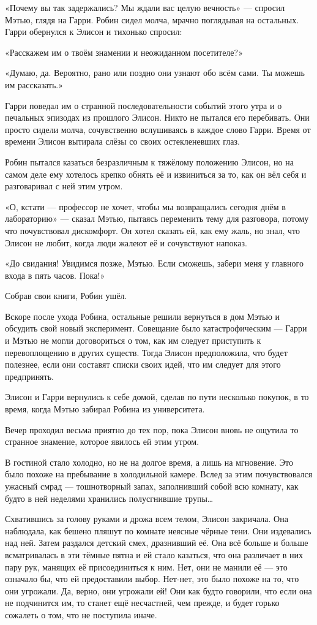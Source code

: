 \documentclass[a5paper, 9pt,
final, openany, twoside=true]{memoir}
\begin{document}
«Почему вы так задержались? Мы ждали вас целую вечность» — спросил Мэтью, глядя на Гарри. Робин сидел молча, мрачно поглядывая на остальных. Гарри обернулся к Элисон и тихонько спросил:

«Расскажем им о твоём знамении и неожиданном посетителе?»

«Думаю, да. Вероятно, рано или поздно они узнают обо всём сами. Ты можешь им рассказать.»

Гарри поведал им о странной последовательности событий этого утра и о печальных эпизодах из прошлого Элисон. Никто не пытался его перебивать. Они просто сидели молча, сочувственно вслушиваясь в каждое слово Гарри. Время от времени Элисон вытирала слёзы со своих остекленевших глаз.

Робин пытался казаться безразличным к тяжёлому положению Элисон, но на самом деле ему хотелось крепко обнять её и извиниться за то, как он вёл себя и разговаривал с ней этим утром.

«О, кстати — профессор не хочет, чтобы мы возвращались сегодня днём в лабораторию» — сказал Мэтью, пытаясь переменить тему для разговора, потому что почувствовал дискомфорт. Он хотел сказать ей, как ему жаль, но знал, что Элисон не любит, когда люди жалеют её и сочувствуют напоказ.

«До свидания! Увидимся позже, Мэтью. Если сможешь, забери меня у главного входа в пять часов. Пока!»

Собрав свои книги, Робин ушёл.\bigskip

Вскоре после ухода Робина, остальные решили вернуться в дом Мэтью и обсудить свой новый эксперимент. Совещание было катастрофическим — Гарри и Мэтью не могли договориться о том, как им следует приступить к перевоплощению в других существ. Тогда Элисон предположила, что будет полезнее, если они составят списки своих идей, что им следует для этого предпринять.

Элисон и Гарри вернулись к себе домой, сделав по пути несколько покупок, в то время, когда Мэтью забирал Робина из университета.

Вечер проходил весьма приятно до тех пор, пока Элисон вновь не ощутила то странное знамение, которое явилось ей этим утром.

В гостиной стало холодно, но не на долгое время, а лишь на мгновение. Это было похоже на пребывание в холодильной камере. Вслед за этим почувствовался ужасный смрад — тошнотворный запах, заполнивший собой всю комнату, как будто в ней неделями хранились полусгнившие трупы…

Схватившись за голову руками и дрожа всем телом, Элисон закричала. Она наблюдала, как бешено пляшут по комнате неясные чёрные тени. Они издевались над ней. Затем раздался детский смех, дразнивший её. Она всё больше и больше всматривалась в эти тёмные пятна и ей стало казаться, что она различает в них пару рук, манящих её присоединиться к ним. Нет, они не манили её — это означало бы, что ей предоставили выбор. Нет-нет, это было похоже на то, что они угрожали. Да, верно, они угрожали ей! Они как будто говорили, что если она не подчинится им, то станет ещё несчастней, чем прежде, и будет горько сожалеть о том, что не поступила иначе.
\end{document}
